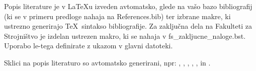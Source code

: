 Popis literature je v \LaTeX u izveden avtomatsko, glede na vašo bazo 
bibliografij (ki se v primeru predloge nahaja na References.bib) ter izbrane 
makre, ki ustrezno generirajo \TeX~sintakso bibliografije. Za zaključna dela na 
Fakulteti za Strojništvo je izdelan ustrezen makro, ki se nahaja v 
fs\_zakljucne\_naloge.bst. Uporabo le-tega definirate z ukazom 
\verb|| v glavni datoteki.

Sklici na popis literaturo so avtomatsko generirani, npr: \cite{bazant_1991}, 
\cite{Doe_1991},  \cite{Bazant_2008}, \cite{Gonzalez_2014, Bazant_2005} 
\cite{Bazant_2007, Kogoj_DTD, Merkur_2005, SURS_2009, SURS_2005, MKariera, 
Encyclopedia, Posl_app, ZGD, ZOP}, \cite{ISO_2573}, \cite{DIN_4768} in 
\cite{JISB0601, Novak_2015}.





